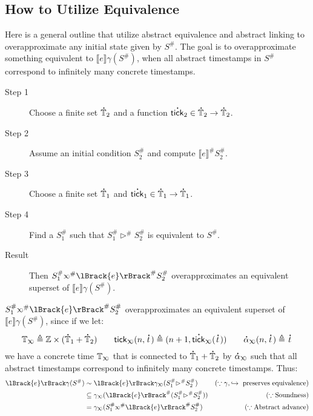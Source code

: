 \documentclass[acmsmall,screen,review]{acmart}\settopmatter{printfolios=true,printccs=false,printacmref=false}
\theoremstyle{acmdefinition}
\newcommand*{\A}[1]{\overset{\,_{\mbox{\Large .}}}{#1}}
\newcommand*{\Abs}[1]{{#1}^{\#}}
\newcommand*{\Time}{\mathbb{T}}
\newcommand*{\ATime}{\A{\Time}}
\newcommand*{\semarrow}{\hookrightarrow}
\newcommand*{\semlink}{\mathbin{\rotatebox[origin=c]{180}{$\propto$}}}
\newcommand*{\equivalent}{\sim}
\newcommand*{\sembracket}[1]{\lBrack{#1}\rBrack}
\newcommand*{\tick}{\mathsf{tick}}
\begin{document}
\subsection{How to Utilize Equivalence}
Here is a general outline that utilize abstract equivalence and abstract linking to overapproximate any initial state given by $\Abs{S}$.
The goal is to overapproximate something equivalent to $\sembracket{e}\gamma(\Abs{S})$, when all abstract timestamps in $\Abs{S}$ correspond to infinitely many concrete timestamps.
\begin{description}
  \item[Step 1] Choose a finite set $\A\Time_2$ and a function $\A\tick_2\in\A\Time_2\rightarrow\A\Time_2$.
  \item[Step 2] Assume an initial condition $\Abs{S}_2$ and compute $\Abs{\sembracket{e}}\Abs{S}_2$.
  \item[Step 3] Choose a finite set $\A\Time_1$ and $\A\tick_1\in\A\Time_1\rightarrow\A\Time_1$.
  \item[Step 4] Find a $\Abs{S}_1$ such that $\Abs{S}_1\Abs\rhd\Abs{S}_2$ is equivalent to $\Abs{S}$.
  \item[Result] Then $\Abs{S}_1\Abs\semlink\Abs{\sembracket{e}}\Abs{S}_2$ overapproximates an equivalent superset of $\sembracket{e}\gamma(\Abs{S})$.
\end{description}
$\Abs{S}_1\Abs\semlink\Abs{\sembracket{e}}\Abs{S}_2$ overapproximates an equivalent superset of $\sembracket{e}\gamma(\Abs{S})$, since if we let:
\[\Time_{\semlink}\triangleq\mathbb{Z}\times(\ATime_1+\ATime_2)\qquad\tick_{\semlink}(n,\A{t})\triangleq(n+1,\A\tick_{\semlink}(\A{t}))\qquad\A\alpha_{\semlink}(n,\A{t})\triangleq\A{t}\]
we have a concrete time $\Time_{\semlink}$ that is connected to $\ATime_1+\ATime_2$ by $\A\alpha_{\semlink}$ such that all abstract timestamps correspond to infinitely many concrete timestamps.
Thus:
\begin{align*}
  \sembracket{e}\gamma(\Abs{S}) & \equivalent\sembracket{e}\gamma_{\semlink}(\Abs{S}_1\Abs\rhd\Abs{S}_2)       & (\because\gamma,\semarrow\text{ preserves equivalence}) \\
                                & \subseteq\gamma_{\semlink}(\Abs{\sembracket{e}}(\Abs{S}_1\Abs\rhd\Abs{S}_2)) & (\because\text{Soundness})                              \\
                                & =\gamma_{\semlink}(\Abs{S}_1\Abs\semlink\Abs{\sembracket{e}}\Abs{S}_2)       & (\because\text{Abstract advance})
\end{align*}
\end{document}
